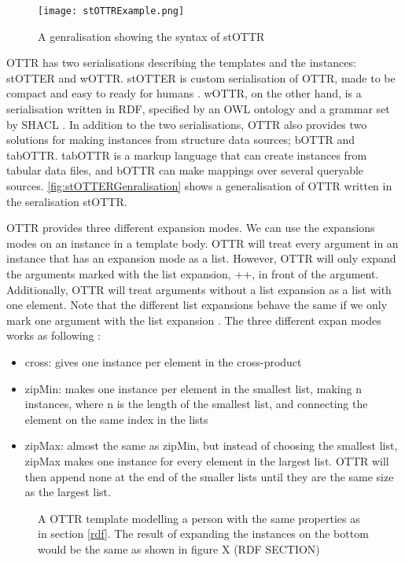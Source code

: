 \begin{figure}
    \centering
    \texttt{[image: stOTTRExample.png]}
    \caption{A genralisation showing the syntax of stOTTR}
    \label{fig:stOTTERGenralisation}
\end{figure}

\para
OTTR has two serialisations describing the templates and the instances: stOTTER and wOTTR. stOTTER is custom serialisation of OTTR, made to be compact and easy to ready for humans \autocite[4]{SLKK_OTTR_2021}. wOTTR, on the other hand, is a serialisation written in RDF, specified by an OWL ontology and a grammar set by SHACL \autocite{SHACL} \autocite[4]{SLKK_OTTR_2021}. In addition to the two serialisations, OTTR also provides two solutions for making instances from structure data sources; bOTTR and tabOTTR. tabOTTR is a markup language that can create instances from tabular data files, and bOTTR can make mappings over several queryable sources\autocite[16]{SLKK_OTTR_2021}. \autoref{fig:stOTTERGenralisation} shows a generalisation of OTTR written in the seralisation stOTTR.

\para
OTTR provides three different expansion modes. We can use the expansions modes on an instance in a template body. OTTR will treat every argument in an instance that has an expansion mode as a list. However, OTTR will only expand the arguments marked with the list expansion, ++, in front of the argument. Additionally, OTTR will treat arguments without a list expansion as a list with one element. Note that the different list expansions behave the same if we only mark one argument with the list expansion \autocite[480]{SLKF_OTTR_2018}. The three different expan modes works as following \autocite[8]{SLKK_OTTR_2021}:
\begin{itemize}
    \item cross: gives one instance per element in the cross-product
    \item zipMin: makes one instance per element in the smallest list, making n instances, where n is the length of the smallest list, and connecting the element on the same index in the lists
    \item zipMax: almost the same as zipMin, but instead of choosing the smallest list, zipMax makes one instance for every element in the largest list. OTTR will then append none at the end of the smaller lists until they are the same size as the largest list. 
\end{itemize}

\begin{figure}
    \begin{example}
        A OTTR template modelling a person with the same properties as in section \ref{rdf}. The result of expanding the instances on the bottom would be the same as shown in figure X (RDF SECTION)
    \end{example}
    
\end{figure}


